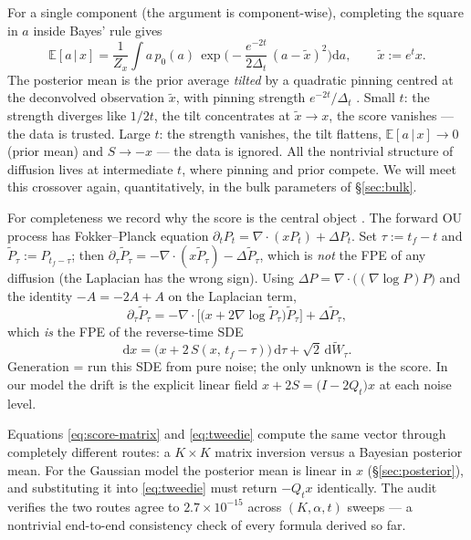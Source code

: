 \documentclass[11pt]{article}
\theoremstyle{definition}
\newcommand{\E}{\mathbb{E}}
\newcommand{\Dt}{\Delta_t}
\newcommand{\Qt}{Q_t}
\newcommand{\given}{\,|\,}
\newcommand{\dd}{\mathrm{d}}
\begin{document}
\begin{bayesianview}
For a single component (the argument is component-wise), completing the square
in $a$ inside Bayes' rule gives
\[
  \E[a\given x]=\frac1{Z_x}\int a\,p_0(a)\,
  \exp\!\Big(-\frac{e^{-2t}}{2\Dt}\,(a-\widetilde x)^2\Big)\dd a,
  \qquad \widetilde x:=e^{t}x .
\]
The posterior mean is the prior average \emph{tilted} by a quadratic pinning
centred at the deconvolved observation $\widetilde x$, with pinning strength
$e^{-2t}/\Dt$ \citep{mezard2025generative}. Small $t$: the strength diverges
like $1/2t$, the tilt concentrates at $\widetilde x\to x$, the score
vanishes --- the data is trusted. Large $t$: the strength vanishes, the tilt
flattens, $\E[a\given x]\to0$ (prior mean) and $S\to-x$ --- the data is
ignored. All the nontrivial structure of diffusion lives at intermediate $t$,
where pinning and prior compete. We will meet this crossover again,
quantitatively, in the bulk parameters of \S\ref{sec:bulk}.
\end{bayesianview}

\begin{derivation}
For completeness we record why the score is the central object
\citep{song2021scorebased,mezard2025generative}. The forward OU
process has Fokker--Planck equation
$\partial_tP_t=\nabla\!\cdot\!(xP_t)+\Delta P_t$. Set $\tau:=t_f-t$ and
$\widetilde P_\tau:=P_{t_f-\tau}$; then
$\partial_\tau\widetilde P_\tau=-\nabla\!\cdot\!(x\widetilde P_\tau)
-\Delta\widetilde P_\tau$, which is \emph{not} the FPE of any diffusion (the
Laplacian has the wrong sign). Using
$\Delta P=\nabla\!\cdot\!\big((\nabla\log P)P\big)$ and the identity
$-A=-2A+A$ on the Laplacian term,
\[
  \partial_\tau\widetilde P_\tau
  =-\nabla\!\cdot\!\Big[\big(x+2\nabla\log\widetilde P_\tau\big)
  \widetilde P_\tau\Big]+\Delta\widetilde P_\tau ,
\]
which \emph{is} the FPE of the reverse-time SDE
\[
  \dd x=\big(x+2\,S(x,\,t_f-\tau)\big)\,\dd\tau+\sqrt2\,\dd\widetilde W_\tau .
\]
Generation = run this SDE from pure noise; the only unknown is the score. In
our model the drift is the explicit linear field
$x+2S=\big(I-2\Qt\big)x$ at each noise level.
\end{derivation}

\begin{intuition}
Equations \eqref{eq:score-matrix} and \eqref{eq:tweedie} compute the same
vector through completely different routes: a $K\times K$ matrix inversion
versus a Bayesian posterior mean. For the Gaussian model the posterior mean is
linear in $x$ (\S\ref{sec:posterior}), and substituting it into
\eqref{eq:tweedie} must return $-\Qt x$ identically. The audit verifies the
two routes agree to $2.7\times10^{-15}$ across $(K,\alpha,t)$ sweeps ---
a nontrivial end-to-end consistency check of every formula derived so far.
\end{intuition}
\end{document}

